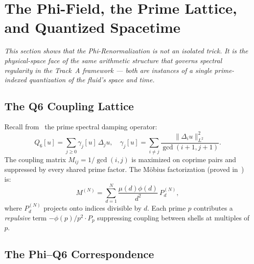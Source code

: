\documentclass[11pt]{article}
\begin{document}
\section{The Phi-Field, the Prime Lattice, and Quantized Spacetime}
\label{sec:prime}

\textit{This section shows that the Phi-Renormalization is not an isolated
trick. It is the physical-space face of the same arithmetic structure
that governs spectral regularity in the Track~A framework --- both
are instances of a single prime-indexed quantization of the fluid's
space and time.}

\subsection{The Q6 Coupling Lattice}

Recall from~\cite{SimonsRingLemma2026} the prime spectral damping operator:
\[
  Q_6[u] = \sum_{j\geq 0}\gamma_j[u]\,\Delta_j u,\quad
  \gamma_j[u] = \sum_{i\neq j}\frac{\|\Delta_i u\|_{L^2}^2}{\gcd(i+1,j+1)}.
\]
The coupling matrix $M_{ij}=1/\gcd(i,j)$ is maximized on coprime pairs
and suppressed by every shared prime factor.
The M\"{o}bius factorization (proved in~\cite{SimonsQ6RH2026}) is:
\[
  M^{(N)} = \sum_{d=1}^N \frac{\mu(d)\phi(d)}{d^2}\,P_d^{(N)},
\]
where $P_d^{(N)}$ projects onto indices divisible by $d$.
Each prime $p$ contributes a \emph{repulsive} term $-\phi(p)/p^2\cdot P_p$
suppressing coupling between shells at multiples of $p$.

\subsection{The Phi--Q6 Correspondence}
\end{document}
